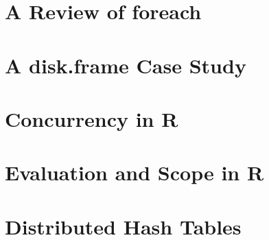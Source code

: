 \section{A Review of foreach}\label{sec:review-foreach}

\section{A disk.frame Case Study}\label{sec:disk-frame-study}

\section{Concurrency in R}\label{sec:concurrency-r}

\section{Evaluation and Scope in R}\label{sec:eval-r}

\section{Distributed Hash Tables}\label{sec:dht}

